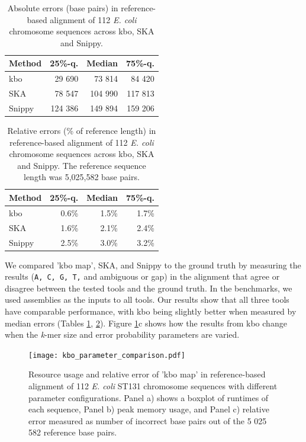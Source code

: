 \documentclass[unnumsec,webpdf,modern,large]{biorxiv}%
\theoremstyle{thmstyleone}%
\theoremstyle{thmstyletwo}%
\theoremstyle{thmstylethree}%
\newcommand{\kbo}{{\sf kbo}}
\begin{document}
\begin{table}[]
\centering
\begin{tabular}{lrrr}
Method & 25\%-q.  & Median  & 75\%-q. \\
\hline
\kbo    & 29 690 & 73 814   & 84 420  \\
SKA    & 78 547 & 104 990 & 117 813 \\
Snippy  & 124 386 & 149 894 & 159 206  \\
\end{tabular}
\caption{Absolute errors (base pairs) in reference-based alignment of 112 \textit{E. coli} chromosome sequences across \kbo, SKA and Snippy.}
\label{map-absolute-error}
\end{table}
\begin{table}[]
\centering
\begin{tabular}{lrrr}
Method & 25\%-q.  & Median  & 75\%-q. \\
\hline
\kbo    & 0.6\% & 1.5\% & 1.7\%  \\
SKA    & 1.6\% & 2.1\% & 2.4\% \\
Snippy  & 2.5\% & 3.0\%   & 3.2\%  \\
\end{tabular}
\caption{Relative errors (\% of reference length) in reference-based alignment of 112 \textit{E. coli} chromosome sequences across \kbo, SKA and Snippy. The reference sequence length was 5,025,582 base pairs.}
\label{map-relative-error}
\end{table}

We compared 'kbo map', SKA\cite{derelle2024seamless}, and Snippy\cite{seemann2015snippy} to the ground truth by measuring the results ({\tt A, C, G, T,} and ambiguous or gap) in the alignment that agree or disagree between the tested tools and the ground truth. In the benchmarks, we used assemblies as the inputs to all tools. Our results show that all three tools have comparable performance, with {\sf kbo} being slightly better when measured by median errors (Tables \ref{map-absolute-error}, \ref{map-relative-error}). Figure \ref{fig:map-by-kmer-size}c shows how the results from {\sf kbo} change when the \emph{k}-mer size and error probability parameters are varied.

\begin{figure}
    \centering
    \texttt{[image: kbo\_parameter\_comparison.pdf]}
    \caption{Resource usage and relative error of 'kbo map' in reference-based alignment of 112 \textit{E. coli} ST131 chromosome sequences with different parameter configurations. Panel a) shows a boxplot of runtimes of each sequence, Panel b) peak memory usage, and Panel c) relative error measured as number of incorrect base pairs out of the 5 025 582 reference base pairs.}
    \label{fig:map-by-kmer-size}
\end{figure}
\end{document}
